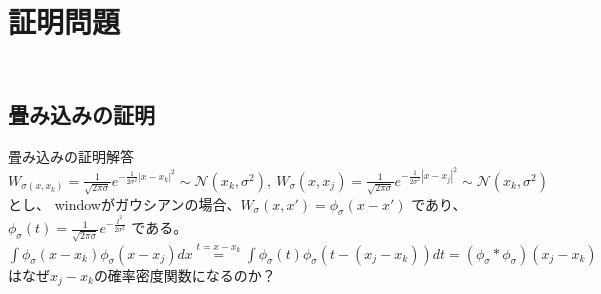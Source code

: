 \section{\\証明問題}

\subsection{\\畳み込みの証明}\label{convolution-proof}
\begin{reidai}{畳み込みの証明}{解答}
$W_{\sigma(x, x_k)} = \frac{1}{\sqrt{2\pi\sigma}} e^{-\frac{1}{2\sigma^2}|x-x_k|^2}\sim \mathcal{N}(x_k,\sigma^2),\ W_\sigma(x, x_j) = \frac{1}{\sqrt{2\pi\sigma}} e^{-\frac{1}{2\sigma^2}|x-x_j|^2}\sim \mathcal{N}(x_k,\sigma^2)$とし、
windowがガウシアンの場合、$W_\sigma(x, x') = \phi_\sigma(x - x')$ であり、$\phi_\sigma(t) = \frac{1}{\sqrt{2\pi\sigma}} e^{-\frac{t^2}{2\sigma^2}}$ である。
$ \displaystyle\int \phi_{\sigma}(x-x_k)\phi_{\sigma}(x-x_j)dx \displaystyle\overset{t=x-x_k}{=}\int \phi_{\sigma}(t)\phi_{\sigma}(t-(x_j-x_k))dt=\displaystyle (\phi_{\sigma}\ast\phi_{\sigma})(x_j-x_k)$はなぜ$x_j-x_k$の確率密度関数になるのか？
\end{reidai}
\kai \\

